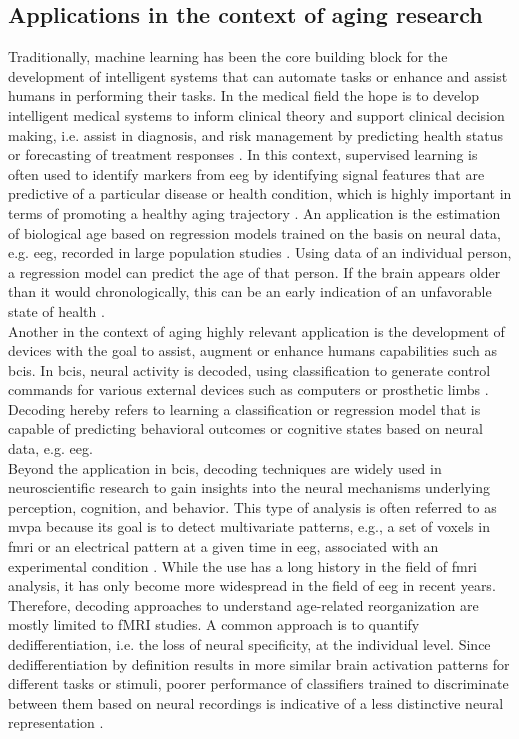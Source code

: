 \subsection{Applications in the context of aging research}
Traditionally, machine learning has been the core building block for the development of intelligent systems that can automate tasks or enhance and assist humans in performing their tasks. In the medical field the hope is to develop intelligent medical systems to inform clinical theory and support clinical decision making, i.e. assist in diagnosis, and risk management by predicting health status or forecasting of treatment responses \cite{Woo2017}. In this context, supervised learning is often used to identify markers from \gls{eeg} by identifying signal features that are predictive of a particular disease or health condition, which is highly important in terms of promoting a healthy aging trajectory \cite{Babiloni_AlzCons2021,Mei2021}. An application is the estimation of biological age based on regression models trained on the basis on neural data, e.g. \gls{eeg}, recorded in large population studies \cite{Engemann2022}. Using data of an individual person, a regression model can predict the age of that person. If the brain appears older than it would chronologically, this can be an early indication of an unfavorable state of health \cite{Gonneaud2021}.\\
Another in the context of aging highly relevant application is the development of devices with the goal to assist, augment or enhance humans capabilities such as \glspl{bci}. In \glspl{bci}, neural activity is decoded, using classification to generate control commands for various external devices such as computers or prosthetic limbs \cite{Saha2021, Anumanchipalli2019}. Decoding hereby refers to learning a classification or regression model that is capable of predicting behavioral outcomes or cognitive states based on neural data, e.g. \gls{eeg}.\\
Beyond the application in \glspl{bci}, decoding techniques are widely used in neuroscientific research to gain insights into the neural mechanisms underlying perception, cognition, and behavior. This type of analysis is often referred to as \gls{mvpa} because its goal is to detect multivariate patterns, e.g., a set of voxels in \gls{fmri} or an electrical pattern at a given time in \gls{eeg}, associated with an experimental condition \cite{Holdgraf2017}.  While the use has a long history in the field of \gls{fmri} analysis, it has only become more widespread in the field of \gls{eeg} in recent years.  Therefore, decoding approaches to understand age-related reorganization are mostly limited to fMRI studies. A common approach is to quantify dedifferentiation, i.e. the loss of neural specificity, at the individual level. Since dedifferentiation by definition results in more similar brain activation patterns for different tasks or stimuli, poorer performance of classifiers trained to discriminate between them based on neural recordings is indicative of a less distinctive neural representation \cite{Koen2019, Park2010}. \\ 
